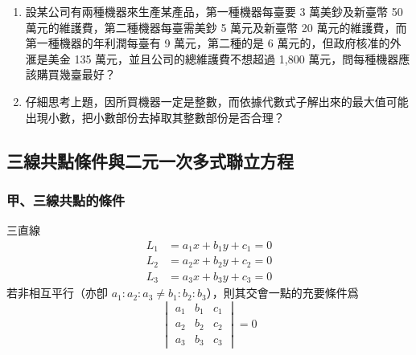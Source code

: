 \begin{enumerate}[label=\arabic*., leftmargin=2em]
  \begin{figure}[H]
  \centering
  \caption{直線傾斜角與垂直關係}
  \label{fig:4-39}
  \end{figure}
  
  \item 設某公司有兩種機器來生產某產品，第一種機器每臺要 3 萬美鈔及新臺幣 50 萬元的維護費，第二種機器每臺需美鈔 5 萬元及新臺幣 20 萬元的維護費，而第一種機器的年利潤每臺有 9 萬元，第二種的是 6 萬元的，但政府核准的外滙是美金 135 萬元，並且公司的總維護費不想超過 1,800 萬元，問每種機器應該購買幾臺最好？
  
  \item 仔細思考上題，因所買機器一定是整數，而依據代數式子解出來的最大值可能出現小數，把小數部份去掉取其整數部份是否合理？
\end{enumerate}


\subsection{三線共點條件與二元一次多式聯立方程}
\label{sec:4-5}

\subsubsection*{甲、三線共點的條件}

\begin{theorem}
三直線
\begin{align*}
L_1 &= a_1 x + b_1 y + c_1 = 0 \\
L_2 &= a_2 x + b_2 y + c_2 = 0 \\
L_3 &= a_3 x + b_3 y + c_3 = 0
\end{align*}
若非相互平行（亦卽 $a_1 : a_2 : a_3 \neq b_1 : b_2 : b_3$），則其交會一點的充要條件爲
\begin{equation}
\begin{vmatrix}
a_1 & b_1 & c_1 \\
a_2 & b_2 & c_2 \\
a_3 & b_3 & c_3
\end{vmatrix} = 0
\label{eq:b3s-4-29}
\end{equation}
\end{theorem}

